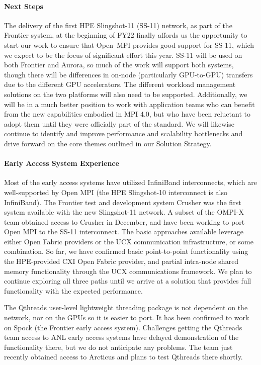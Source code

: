 \paragraph{Next Steps}
The delivery of the first HPE Slingshot-11 (SS-11) network, as part of the Frontier system, at the beginning of FY22 finally affords us
the opportunity to start our work to ensure that Open~MPI provides good support for SS-11, which we expect to be the focus of significant
effort this year.  SS-11 will be used on both Frontier and Aurora, so much of the work will support both systems, though there will be differences 
in on-node (particularly GPU-to-GPU) transfers due to the different GPU accelerators.  The different workload management solutions on the two platforms
will also need to be supported.  Additionally, we will be in a much better position to work with application teams who can benefit from the new capabilities 
embodied in MPI 4.0, but who have been reluctant to adopt them until they were officially part of the standard.  
We will likewise continue to identify and improve performance and scalability bottlenecks and drive forward on
the core themes outlined in our Solution Strategy.

\paragraph{Early Access System Experience}
Most of the early access systems have utilized InfiniBand interconnects, which are well-supported 
by Open MPI (the HPE Slingshot-10 interconnect is also InfiniBand).  The Frontier test and development
system Crusher was the first system available with the new Slingshot-11 network.  A subset of the
OMPI-X team obtained access to Crusher in December, and have been working to port Open MPI to
the SS-11 interconnect.  The basic approaches available leverage either Open Fabric providers or
the UCX communication infrastructure, or some combination.
So far, we have confirmed basic point-to-point functionality using the HPE-provided
CXI Open Fabric provider, and partial intra-node shared memory functionality through the 
UCX communications framework.
We plan to continue exploring all three paths until we arrive at a solution that provides full functionality
with the expected performance.

The Qthreads user-level lightweight threading package is not dependent on the network, nor on the GPUs
so it is easier to port.  It has been confirmed to work on Spock (the Frontier early access system).
Challenges getting the Qthreads team access to ANL early access systems have delayed demonstration
of the functionality there, but we do not anticipate any problems.  The team just recently obtained
access to Arcticus and plans to test Qthreads there shortly.
